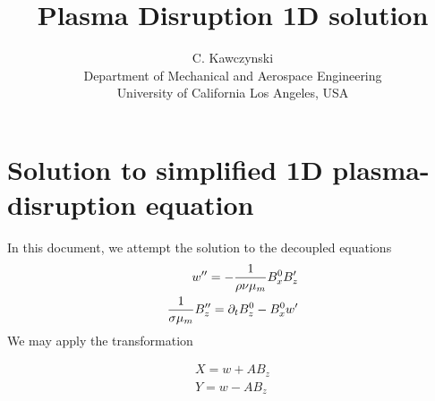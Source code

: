 \documentclass[11pt]{article}
\begin{document}
\doublespacing
\title{Plasma Disruption 1D solution}
\author{C. Kawczynski \\
Department of Mechanical and Aerospace Engineering \\
University of California Los Angeles, USA\\
}
\maketitle

\section{Solution to simplified 1D plasma-disruption equation}
In this document, we attempt the solution to the decoupled equations
\begin{equation}\begin{aligned}
w'' = - \frac{1}{\rho \nu {\mu_m}} B_x^0 B_z' \\
\frac{1}{\sigma {\mu_m}} B_z'' = \partial_t B_z^0 - B_x^0 w' \\
\end{aligned} \end{equation}
We may apply the transformation

\begin{equation}\begin{aligned}
X = w + A B_z \\
Y = w - A B_z \\
\end{aligned} \end{equation}
\end{document}
